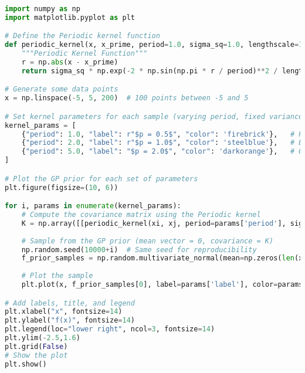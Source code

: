 \documentclass[12pt,a4paper]{article}
\begin{document}
\vspace{10pt}
\begin{lstlisting}[language=python, caption={Code of the Creation of Figure \ref{fig:Per samples diff period plot}}]
import numpy as np
import matplotlib.pyplot as plt

# Define the Periodic kernel function
def periodic_kernel(x, x_prime, period=1.0, sigma_sq=1.0, lengthscale=1.0):
    """Periodic Kernel Function"""
    r = np.abs(x - x_prime)
    return sigma_sq * np.exp(-2 * np.sin(np.pi * r / period)**2 / lengthscale**2)

# Generate some data points
x = np.linspace(-5, 5, 200)  # 100 points between -5 and 5

# Set kernel parameters for each sample (varying period, fixed variance and lengthscale)
kernel_params = [
    {"period": 1.0, "label": r"$p = 0.5$", "color": 'firebrick'},   # Red for period = 0.5
    {"period": 2.0, "label": r"$p = 1.0$", "color": 'steelblue'},   # Blue for period = 1.0
    {"period": 5.0, "label": "$p = 2.0$", "color": 'darkorange'},   # Green for period = 2.0
]

# Plot the GP prior for each set of parameters
plt.figure(figsize=(10, 6))

for i, params in enumerate(kernel_params):
    # Compute the covariance matrix using the Periodic kernel
    K = np.array([[periodic_kernel(xi, xj, period=params['period'], sigma_sq=1.0, lengthscale=1.0) for xj in x] for xi in x])
    
    # Sample from the GP prior (mean vector = 0, covariance = K)
    np.random.seed(10000+i)  # Same seed for reproducibility
    f_prior_samples = np.random.multivariate_normal(mean=np.zeros(len(x)), cov=K, size=1)
    
    # Plot the sample
    plt.plot(x, f_prior_samples[0], label=params['label'], color=params['color'])

# Add labels, title, and legend
plt.xlabel("x", fontsize=14)
plt.ylabel("f(x)", fontsize=14)
plt.legend(loc="lower right", ncol=3, fontsize=14)
plt.ylim(-2.5,1.6)
plt.grid(False)
# Show the plot
plt.show()
\end{lstlisting}
\end{document}

